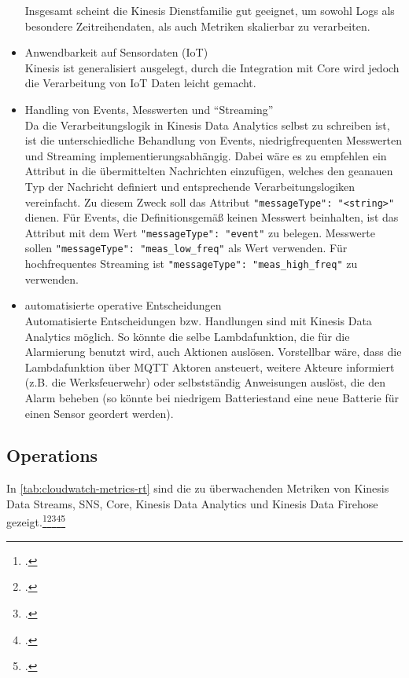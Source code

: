 \begin{itemize}
Insgesamt scheint die Kinesis Dienstfamilie gut geeignet, um sowohl Logs als besondere Zeitreihendaten, als auch Metriken skalierbar zu verarbeiten.

\item Anwendbarkeit auf Sensordaten (\ac{IoT})\\
Kinesis ist generalisiert ausgelegt, durch die Integration mit \AWSIOT{} Core wird jedoch die Verarbeitung von \ac{IoT} Daten leicht gemacht. 

\item Handling von Events, Messwerten und \enquote{Streaming}\\
Da die Verarbeitungslogik in Kinesis Data Analytics selbst zu schreiben ist, ist die unterschiedliche Behandlung von Events, niedrigfrequenten Messwerten und Streaming implementierungsabhängig. Dabei wäre es zu empfehlen ein Attribut in die übermittelten Nachrichten einzufügen, welches den geanauen Typ der Nachricht definiert und entsprechende Verarbeitungslogiken vereinfacht. Zu diesem Zweck soll das Attribut \texttt{{"messageType": "<string>"}} dienen. Für Events, die Definitionsgemäß keinen Messwert beinhalten, ist das Attribut mit dem Wert \texttt{{"messageType": "event"}} zu belegen. Messwerte sollen \texttt{{"messageType": "meas_low_freq"}} als Wert verwenden. Für hochfrequentes Streaming ist \texttt{{"messageType": "meas_high_freq"}} zu verwenden.

\item automatisierte operative Entscheidungen\\
Automatisierte Entscheidungen bzw. Handlungen sind mit Kinesis Data Analytics möglich. So könnte die selbe Lambdafunktion, die für die Alarmierung benutzt wird, auch Aktionen auslösen. Vorstellbar wäre, dass die Lambdafunktion über \ac{MQTT} Aktoren ansteuert, weitere Akteure informiert (z.B. die Werksfeuerwehr) oder selbstständig Anweisungen auslöst, die den Alarm beheben (so könnte bei niedrigem Batteriestand eine neue Batterie für einen Sensor geordert werden). 
\end{itemize}


\subsection{Operations} \label{chap:echtzeit_ops}
In \autoref{tab:cloudwatch-metrics-rt} sind die zu überwachenden Metriken von Kinesis Data Streams, \ac{SNS}, \AWSIOT{} Core, Kinesis Data Analytics und Kinesis Data Firehose gezeigt.\footcite[Vgl.][]{AmazonWebServicesInc..o.J.bb}\nzitat\footcite[Vgl.][]{AmazonWebServicesInc..o.J.bc}\nzitat\footcite[Vgl.][]{AmazonWebServicesInc..o.J.az}\nzitat\footcite[Vgl.][]{AmazonWebServicesInc..o.J.ay}\nzitat\footcite[Vgl.][]{AmazonWebServicesInc..o.J.bj}

